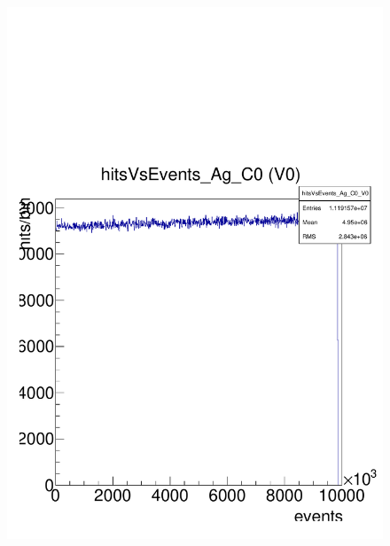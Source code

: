 \documentclass[a4paper,12pt,twoside]{article}
\begin{document}
\begin{figure} [h!]
\begin{minipage}{.48\textwidth}
  \includegraphics[width=\textwidth]{./Figures/HRData_HitsEvents.pdf}
  \label{HRData-HitsEvent}
\end{minipage}
\end{figure}
\end{document}
